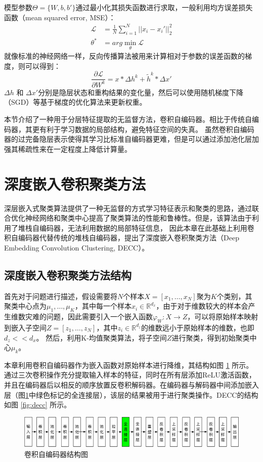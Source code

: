 模型参数$\Theta=\{{W},{b},{b'}\}$通过最小化其损失函数进行求取，一般利用均方误差损失函数（mean squared error, MSE）：
\begin{align}
	\mathscr{L} &= \frac{1}{N}\sum_{i=1}^N||x_i-x_i'||_2^2 \label{equ:mse_loss}\\
	\theta^* &= arg\min\limits_{\theta} \mathscr{L}  \label{equ:mse}
\end{align}
就像标准的神经网络一样，反向传播算法被用来计算相对于参数的误差函数的梯度，则可以得到：
\begin{equation}
	\frac{\partial \mathscr{L}}{\partial W^k}=x * \Delta h ^k+\tilde{h}^k * \Delta x'
\end{equation}
$\Delta h$ 和 $\Delta x'$分别是隐层状态和重构结果的变化量，然后可以使用随机梯度下降（SGD）等基于梯度的优化算法来更新权重。

本节介绍了一种用于分层特征提取的无监督方法，卷积自编码器。相比于传统自编码器，其更有利于学习数据的局部结构，避免特征空间的失真。
虽然卷积自编码器的过完备隐层表示使得其学习比标准自编码器更难，但是可以通过添加池化层加强其稀疏性来在一定程度上降低计算量。

\section{深度嵌入卷积聚类方法}
\label{sec:decc_method}
深层嵌入式聚类算法提供了一种无监督的方式学习特征表示和聚类的思路，通过联合优化神经网络和聚类中心提高了聚类算法的性能和鲁棒性。但是，该算法由于利用了堆栈自编码器，无法利用数据的局部特征信息，
因此本章在此基础上利用卷积自编码器代替传统的堆栈自编码器，提出了深度嵌入卷积聚类方法（Deep Embedding Convolution Clustering, DECC）。

\subsection{深度嵌入卷积聚类方法结构}
首先对于问题进行描述，假设需要将$N$个样本$X=[x_1,\dots,x_N]$聚为$K$个类别，其聚类中心点为$\mu_1,\dots,\mu_K$，其中每一个样本$x_i\in \mathbb{R}^{d_x}$，由于对于维数较大的样本会产生维数灾难的问题，因此需要引入一个嵌入函数$\varphi_W: X \rightarrow Z$，可以将原始样本映射到嵌入子空间$Z=[z_1,\dots,z_N]$，其中$z_i\in \mathbb{R}^{d_z}$的维数远小于原始样本的维数，也即$d_z<<d_x$。
然后，利用K-均值聚类算法，将子空间$Z$进行聚类，得到初始聚类中心${\mu_k}$。

本章利用卷积自编码器作为嵌入函数对原始样本进行降维，其结构如图 \ref{fig:cae} 所示。
通过三次卷积操作充分提取输入样本的特征，同时在所有层添加ReLU激活函数，并且在编码器后以相反的顺序放置反卷积解码器。在编码器与解码器中间添加嵌入层（图\ref{fig:cae}中绿色标记的全连接层），该层的结果被用于进行聚类操作。DECC的结构如图 \ref{fig:decc} 所示。
\begin{figure}[hbt]
	\centering
	\includegraphics[width=13.5cm]{figures/AE/cae}
	\caption{卷积自编码器结构图}
	\label{fig:cae}
\end{figure}

